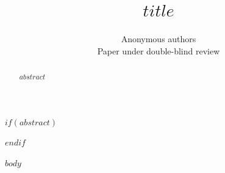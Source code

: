\documentclass[10pt]{article}
\title{$title$}
\author{\name Anonymous authors \\ \addr Paper under double-blind review}
\begin{document}
\maketitle

$if(abstract)$
\begin{abstract}
$abstract$
\end{abstract}
$endif$

$body$
\end{document}
